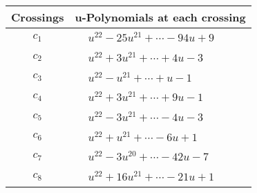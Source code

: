 \documentclass[1p]{elsarticle_modified}
\theoremstyle{definition}
\begin{document}
\begin{tabular}{m{50pt}|m{274pt}}
Crossings & \hspace{64pt}u-Polynomials at each crossing \\
\hline $$\begin{aligned}c_{1}\end{aligned}$$&$\begin{aligned}
&u^{22}-25 u^{21}+\cdots-94 u+9
\end{aligned}$\\
\hline $$\begin{aligned}c_{2}\end{aligned}$$&$\begin{aligned}
&u^{22}+3 u^{21}+\cdots+4 u-3
\end{aligned}$\\
\hline $$\begin{aligned}c_{3}\end{aligned}$$&$\begin{aligned}
&u^{22}- u^{21}+\cdots+u-1
\end{aligned}$\\
\hline $$\begin{aligned}c_{4}\end{aligned}$$&$\begin{aligned}
&u^{22}+3 u^{21}+\cdots+9 u-1
\end{aligned}$\\
\hline $$\begin{aligned}c_{5}\end{aligned}$$&$\begin{aligned}
&u^{22}-3 u^{21}+\cdots-4 u-3
\end{aligned}$\\
\hline $$\begin{aligned}c_{6}\end{aligned}$$&$\begin{aligned}
&u^{22}+u^{21}+\cdots-6 u+1
\end{aligned}$\\
\hline $$\begin{aligned}c_{7}\end{aligned}$$&$\begin{aligned}
&u^{22}-3 u^{20}+\cdots-42 u-7
\end{aligned}$\\
\hline $$\begin{aligned}c_{8}\end{aligned}$$&$\begin{aligned}
&u^{22}+16 u^{21}+\cdots-21 u+1
\end{aligned}$\\

\end{tabular}
\end{document}
